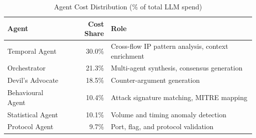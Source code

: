 \begin{table}[H]
\centering
\caption{Agent Cost Distribution (\% of total LLM spend)}
\label{tab:agent-cost-distribution}
\begin{tabularx}{\textwidth}{l r X}
\toprule
Agent & Cost Share & Role \\
\midrule
Temporal Agent & 30.0\% & Cross-flow IP pattern analysis, context enrichment \\
Orchestrator & 21.3\% & Multi-agent synthesis, consensus generation \\
Devil's Advocate & 18.5\% & Counter-argument generation \\
Behavioural Agent & 10.4\% & Attack signature matching, MITRE mapping \\
Statistical Agent & 10.1\% & Volume and timing anomaly detection \\
Protocol Agent & 9.7\% & Port, flag, and protocol validation \\
\bottomrule
\end{tabularx}
\end{table}

